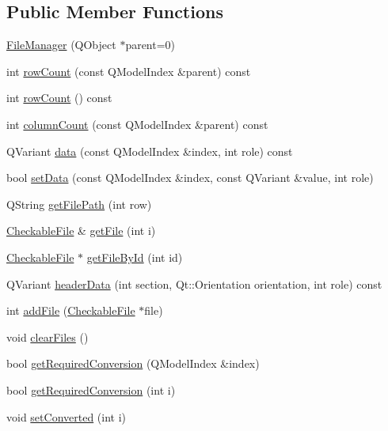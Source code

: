 \subsection*{Public Member Functions}
\begin{DoxyCompactItemize}
\item 
\hyperlink{class_file_manager_aed06615dba6e3987ba4f129505e92edc}{File\+Manager} (Q\+Object $\ast$parent=0)
\item 
int \hyperlink{class_file_manager_aa9d31eb3298e9d05834ab95beb7d2bb5}{row\+Count} (const Q\+Model\+Index \&parent) const 
\item 
int \hyperlink{class_file_manager_a7764e12ab002099b462242ff9bb5337c}{row\+Count} () const 
\item 
int \hyperlink{class_file_manager_ae2423ac9abd3c52d156222cefef3555d}{column\+Count} (const Q\+Model\+Index \&parent) const 
\item 
Q\+Variant \hyperlink{class_file_manager_ab4ad090512825bc604b437be76bc5b46}{data} (const Q\+Model\+Index \&index, int role) const 
\item 
bool \hyperlink{class_file_manager_a5cf1a76c4ab08028ff10468086bdaf92}{set\+Data} (const Q\+Model\+Index \&index, const Q\+Variant \&value, int role)
\item 
Q\+String \hyperlink{class_file_manager_a40338fced75a011297a6cd96da82aa0b}{get\+File\+Path} (int row)
\item 
\hyperlink{class_checkable_file}{Checkable\+File} \& \hyperlink{class_file_manager_a93ffce845f7df82220f3dc450a4fb8fe}{get\+File} (int i)
\item 
\hyperlink{class_checkable_file}{Checkable\+File} $\ast$ \hyperlink{class_file_manager_a3d3c605f92a96d971f18fcdfb283443a}{get\+File\+By\+Id} (int id)
\item 
Q\+Variant \hyperlink{class_file_manager_a158b776ba8de289ce669302ab35367c8}{header\+Data} (int section, Qt\+::\+Orientation orientation, int role) const 
\item 
int \hyperlink{class_file_manager_a4a64b560d32e734dbd42acf6303f9397}{add\+File} (\hyperlink{class_checkable_file}{Checkable\+File} $\ast$file)
\item 
void \hyperlink{class_file_manager_a69455bdd744fdad91a21ca383e93ef7a}{clear\+Files} ()
\item 
bool \hyperlink{class_file_manager_a4505478c3876877d38486994910e35d6}{get\+Required\+Conversion} (Q\+Model\+Index \&index)
\item 
bool \hyperlink{class_file_manager_a38c9259c6681263406ad2c2b21d06aa4}{get\+Required\+Conversion} (int i)
\item 
void \hyperlink{class_file_manager_a354563436fd7d1545edb98c4d9b5de98}{set\+Converted} (int i)
\end{DoxyCompactItemize}


